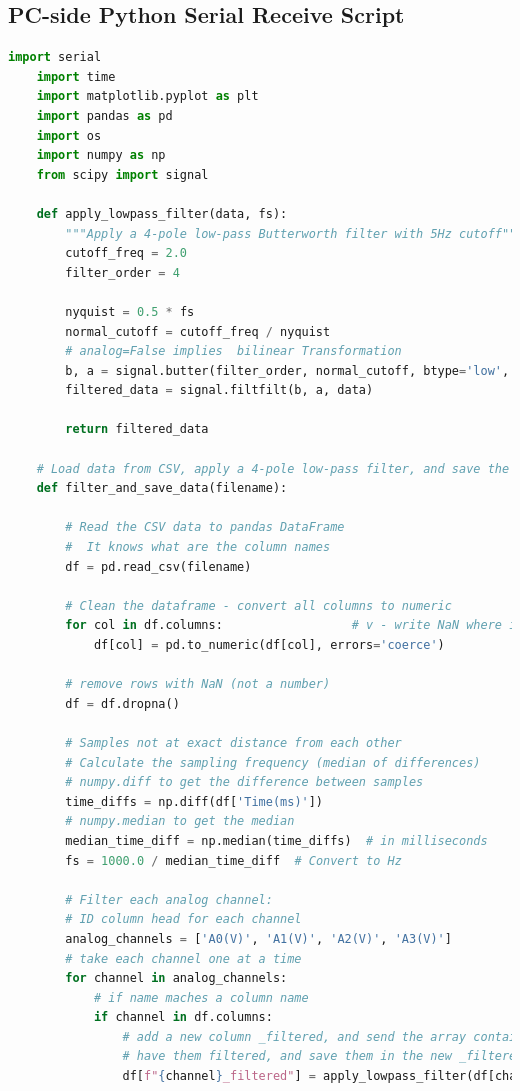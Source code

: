 \subsection{PC-side Python Serial Receive Script}
\begin{lstlisting}[style=pythonstyle, caption=Python Serial Receive Script, label=lst:pythonCodeApp, language=Python ]
    import serial
    import time
    import matplotlib.pyplot as plt
    import pandas as pd
    import os
    import numpy as np
    from scipy import signal
    
    def apply_lowpass_filter(data, fs):
        """Apply a 4-pole low-pass Butterworth filter with 5Hz cutoff"""
        cutoff_freq = 2.0
        filter_order = 4
        
        nyquist = 0.5 * fs
        normal_cutoff = cutoff_freq / nyquist
        # analog=False implies  bilinear Transformation
        b, a = signal.butter(filter_order, normal_cutoff, btype='low', analog=False)
        filtered_data = signal.filtfilt(b, a, data)
        
        return filtered_data
    
    # Load data from CSV, apply a 4-pole low-pass filter, and save the filtered data
    def filter_and_save_data(filename):
        
        # Read the CSV data to pandas DataFrame
        #  It knows what are the column names
        df = pd.read_csv(filename)
        
        # Clean the dataframe - convert all columns to numeric
        for col in df.columns:                  # v - write NaN where it can't convert to number (in teh data, not column names)
            df[col] = pd.to_numeric(df[col], errors='coerce')
    
        # remove rows with NaN (not a number)
        df = df.dropna()
        
        # Samples not at exact distance from each other
        # Calculate the sampling frequency (median of differences)
        # numpy.diff to get the difference between samples
        time_diffs = np.diff(df['Time(ms)'])
        # numpy.median to get the median
        median_time_diff = np.median(time_diffs)  # in milliseconds
        fs = 1000.0 / median_time_diff  # Convert to Hz
        
        # Filter each analog channel:
        # ID column head for each channel 
        analog_channels = ['A0(V)', 'A1(V)', 'A2(V)', 'A3(V)']
        # take each channel one at a time
        for channel in analog_channels:
            # if name maches a column name
            if channel in df.columns:
                # add a new column _filtered, and send the array containing all the raw values to 
                # have them filtered, and save them in the new _filtered column
                df[f"{channel}_filtered"] = apply_lowpass_filter(df[channel].values, fs)
        

\end{lstlisting}
